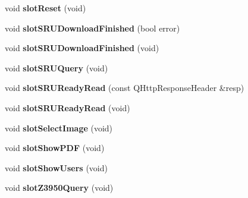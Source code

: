 \begin{DoxyCompactItemize}
\item 
void {\bfseries slot\+Reset} (void)\hypertarget{classbiblioteq__magazine_aae07fff6d5119cfe2660b32858c5559a}{}\label{classbiblioteq__magazine_aae07fff6d5119cfe2660b32858c5559a}

\item 
void {\bfseries slot\+S\+R\+U\+Download\+Finished} (bool error)\hypertarget{classbiblioteq__magazine_a81dbe5bdf964c73d2495103f62407a5d}{}\label{classbiblioteq__magazine_a81dbe5bdf964c73d2495103f62407a5d}

\item 
void {\bfseries slot\+S\+R\+U\+Download\+Finished} (void)\hypertarget{classbiblioteq__magazine_a6c2166d6be894aaa884f498916e1876a}{}\label{classbiblioteq__magazine_a6c2166d6be894aaa884f498916e1876a}

\item 
void {\bfseries slot\+S\+R\+U\+Query} (void)\hypertarget{classbiblioteq__magazine_a3910676f5efa8718bb2e48df1ee49c7a}{}\label{classbiblioteq__magazine_a3910676f5efa8718bb2e48df1ee49c7a}

\item 
void {\bfseries slot\+S\+R\+U\+Ready\+Read} (const Q\+Http\+Response\+Header \&resp)\hypertarget{classbiblioteq__magazine_a7bd42577104b706a2a228cdd6070faa5}{}\label{classbiblioteq__magazine_a7bd42577104b706a2a228cdd6070faa5}

\item 
void {\bfseries slot\+S\+R\+U\+Ready\+Read} (void)\hypertarget{classbiblioteq__magazine_a7e00a4c73e3ffa3bde88e36d73fc94b8}{}\label{classbiblioteq__magazine_a7e00a4c73e3ffa3bde88e36d73fc94b8}

\item 
void {\bfseries slot\+Select\+Image} (void)\hypertarget{classbiblioteq__magazine_afa046729bc79d76f78f60f12231b71d1}{}\label{classbiblioteq__magazine_afa046729bc79d76f78f60f12231b71d1}

\item 
void {\bfseries slot\+Show\+P\+DF} (void)\hypertarget{classbiblioteq__magazine_aa1ca8fee6fcc8e0c09bcb593e944c940}{}\label{classbiblioteq__magazine_aa1ca8fee6fcc8e0c09bcb593e944c940}

\item 
void {\bfseries slot\+Show\+Users} (void)\hypertarget{classbiblioteq__magazine_a523c1274c25eeb93e76babe40b709c95}{}\label{classbiblioteq__magazine_a523c1274c25eeb93e76babe40b709c95}

\item 
void {\bfseries slot\+Z3950\+Query} (void)\hypertarget{classbiblioteq__magazine_a846f231c5809497ee8c173182faa3c61}{}\label{classbiblioteq__magazine_a846f231c5809497ee8c173182faa3c61}

\end{DoxyCompactItemize}
